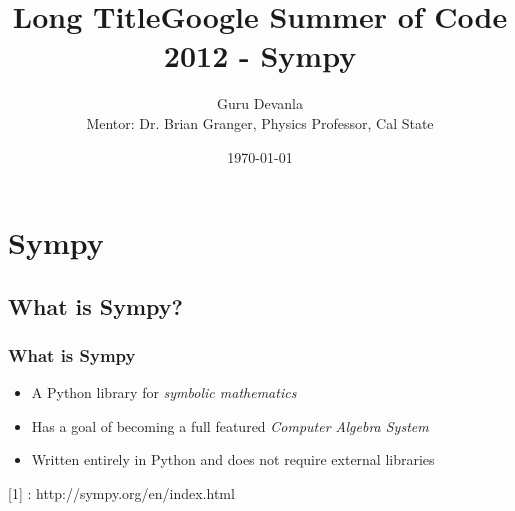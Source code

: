 \documentclass[dvips]{beamer}
\begin{document}
\title[Short Title]{Long Title}
\title[GSoC 2012 Sympy]{Google Summer of Code 2012 - Sympy}
\author[Guru Devanla] {Guru Devanla \\ Mentor: Dr. Brian Granger, Physics Professor, Cal State}


\date[GSOC Meetup]{\today}

\begin{frame}
\titlepage
\end{frame}




\frame{\tableofcontents}

\section{Sympy}
\subsection{What is Sympy?}

\begin{frame}
\frametitle{What is Sympy}
\begin{itemize}
\item A Python library for \emph{symbolic mathematics}
\item Has a goal of becoming a full featured \emph{Computer Algebra System}
\item Written entirely in Python and does not require external libraries
\end{itemize}
\vspace*{0.5in}
\tiny{[1] : http://sympy.org/en/index.html}

\end{frame}
\end{document}

